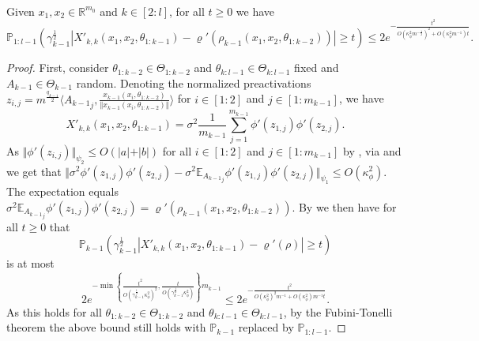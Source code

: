 \documentclass[twoside,11pt]{article}
\newcommand{\R}{\mathbb{R}}
\newcommand{\E}{\mathbb{E}}
\newcommand{\Prob}{\mathbb{P}}
\begin{document}
\begin{proposition}\label{prop:bwd_concentration_1}~\\
Given $x_1,x_2 \in \R^{m_0}$ and $k \in [2:l]$, for all $t \geq 0$ we have
\[
\Prob_{1:l-1}\left( \gamma_{k-1}^{\frac{1}{2}} \left\vert X'_{k,k}(x_1,x_2,\theta_{1:k-1}) - \varrho'(\rho_{k-1}(x_1,x_2,\theta_{1:k-2})) \right\vert \geq t \right) 
\leq 2e^{-\frac{t^2}{O\left( \kappa_\phi^2 m^{-\frac{1}{2}} \right)^2 + O\left( \kappa_\phi^2 m^{-1} \right) t}}.
\]
\end{proposition}
\begin{proof}
First, consider $\theta_{1:k-2} \in \Theta_{1:k-2}$ and $\theta_{k:l-1} \in \Theta_{k:l-1}$ fixed and $A_{k-1} \in \Theta_{k-1}$ random. Denoting the normalized preactivations $z_{i,j} = m^{\frac{q_{k-1}}{2}} \langle {A_{k-1}}_j, \frac{x_{k-1}(x_i, \theta_{1 : k-2})}{\Vert x_{k-1}(x_i, \theta_{1 : k-2}) \Vert} \rangle$ for $i \in [1:2]$ and $j \in [1:m_{k-1}]$, we have
\[
X'_{k,k}(x_1,x_2,\theta_{1:k-1})
= \sigma^2 \frac{1}{m_{k-1}} \sum_{j=1}^{m_{k-1}} \phi'(z_{1,j}) \phi'(z_{2,j}).
\]
As $\Vert \phi'(z_{i,j}) \Vert_{\psi_2} \leq O(\vert a \vert + \vert b \vert)$ for all $i \in [1:2]$ and $j \in [1:m_{k-1}]$ by \citet[Example~2.5.8(iii)]{Vershynin2018}, via \citet[Lemma~2.7.7]{Vershynin2018} and \citet[Exercise~2.7.10]{Vershynin2018} we get that $\Vert \sigma^2 \phi'(z_{1,j}) \phi'(z_{2,j}) - \sigma^2 \E_{{A_{k-1}}_j} \phi'(z_{1,j}) \phi'(z_{2,j}) \Vert_{\psi_1} \leq O(\kappa_\phi^2)$. The expectation equals $\sigma^2 \E_{{A_{k-1}}_j} \phi'(z_{1,j}) \phi'(z_{2,j}) = \varrho'(\rho_{k-1}(x_1,x_2,\theta_{1:k-2}))$. By \citet[Corollary~2.8.3]{Vershynin2018} we then have for all $t \geq 0$ that
\[
\Prob_{k-1}\left( \gamma_{k-1}^{\frac{1}{2}} \left\vert X'_{k,k}(x_1,x_2,\theta_{1:k-1}) - \varrho'(\rho) \right\vert \geq t \right)
\]
is at most
\[
2e^{-\min\left\{ \frac{t^2}{O(\gamma_{k-1}^{\frac{1}{2}} \kappa_\phi^2)^2}, \frac{t}{O(\gamma_{k-1}^{\frac{1}{2}} \kappa_\phi^2)} \right\} m_{k-1}} 
\leq 2e^{-\frac{t^2}{O(\kappa_\phi^2)^2 m^{-1} + O(\kappa_\phi^2) m^{-1} t}}.
\]
As this holds for all $\theta_{1:k-2} \in \Theta_{1:k-2}$ and $\theta_{k:l-1} \in \Theta_{k:l-1}$, by the Fubini-Tonelli theorem the above bound still holds with $\Prob_{k-1}$ replaced by $\Prob_{1:l-1}$.
\end{proof}
\end{document}
